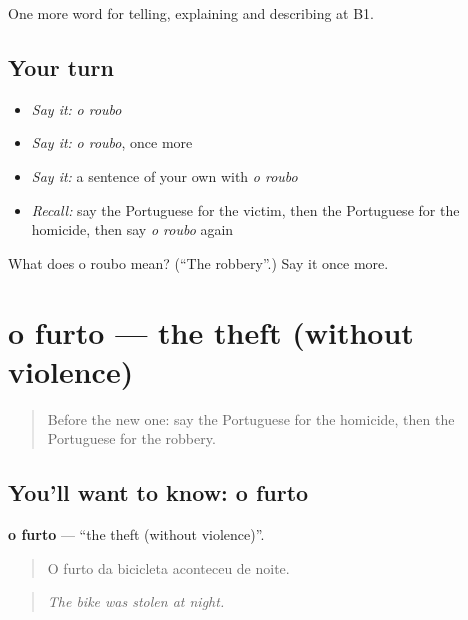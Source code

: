 \begin{grammarlens}[title={What you've built}]
One more word for telling, explaining and describing at B1.
\end{grammarlens}

\subsection*{Your turn}
\begin{itemize}
\raggedright
  \item \emph{Say it:} \emph{o roubo}
  \item \emph{Say it:} \emph{o roubo}, once more
  \item \emph{Say it:} a sentence of your own with \emph{o roubo}
  \item \emph{Recall:} say the Portuguese for the victim, then the Portuguese for the homicide, then say \emph{o roubo} again
\end{itemize}

\begin{tcolorbox}[breakable,colback=teal!4,colframe=teal!35!black,title={Before you move on}]
What does o roubo mean? (\textquotedblleft{}The robbery\textquotedblright{}.) Say it once more.
\end{tcolorbox}
\section[o furto]{o furto — the theft (without violence)}

\label{lesson:PT-C287-furto}



\begin{quote}
Before the new one: say the Portuguese for the homicide, then the Portuguese for the robbery.
\end{quote}

\subsection*{You'll want to know: o furto}
\textbf{o furto} — \textquotedblleft{}the theft (without violence)\textquotedblright{}.

\begin{quote}
O furto da bicicleta aconteceu de noite.
\end{quote}

\begin{quote}
\emph{The bike was stolen at night.}
\end{quote}

